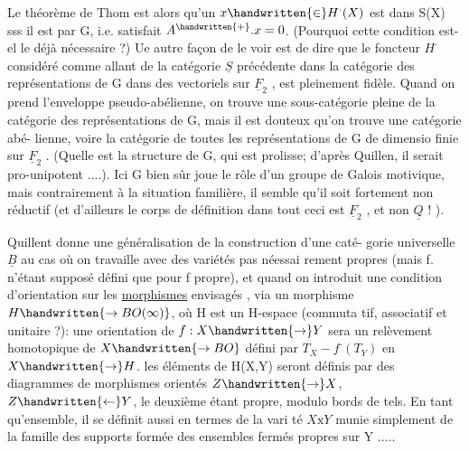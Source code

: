 
Le théorème de Thom est alors qu'un $x \handwritten{\in} H^{\cdot}(X)$ est dans S(X) sss il est
 par G, i.e. satisfait $A^{\handwritten{+}}. x = 0$. (Pourquoi cette condition est-el%
le déjà nécessaire ?) Ue autre façon de le voir est de dire que le
foncteur $H^{\cdot}$ considéré comme allant de la catégorie $\underline{S}$ précédente dans
la catégorie des  représentations de G dans des vectoriels
sur $\underline{F}_2$ , est pleinement fidèle.  Quand on prend l'enveloppe
pseudo-abélienne, on trouve une sous-catégorie pleine de la catégorie des
représentations de G, mais il est douteux qu'on trouve une catégorie abé-%
lienne, voire la catégorie de toutes les représentations de G de dimensio
finie sur $\underline{F}_2$ . (Quelle est la structure de G, qui est prolisse; d'après
Quillen, il serait pro-unipotent ....). Ici G bien sûr joue le rôle d'un
groupe de Galois motivique, mais contrairement à la situation familière,
il semble qu'il soit fortement non réductif (et d'ailleurs le corps de
définition dans tout ceci est $\underline{F}_2$ , et non $\underline{Q}$ ! ).

Quillent donne une généralisation de la construction d'une caté-%
gorie universelle $\underline{B}$ au cas où on travaille avec des variétés pas néessai%
rement propres (mais f. n'étant supposé défini que pour f propre), et
quand on introduit une condition d'orientation  sur les \uline{morphismes}
envisagés , via un morphisme $H \handwritten{\to BO(\infty)}$, où H est un H-espace (commuta%
tif, associatif et unitaire ?): une orientation de $f:X \handwritten{\to} Y$ sera un
relèvement homotopique de $X \handwritten{\to BO}$ défini par  $T_X - f^{\cdot}(T_Y)$ en $X \handwritten{\to} H$.
les éléments de H(X,Y) seront définis par des diagrammes de morphismes
orientés $Z \handwritten{\to} X$, $Z \handwritten{\leftarrow} Y$, le deuxième étant propre, modulo bords de tels.
En tant qu'ensemble, il se définit aussi en termes de la vari té $X\mathrm{x}Y$
munie simplement de la famille des supports formée des ensembles fermés
propres sur Y ..... 

